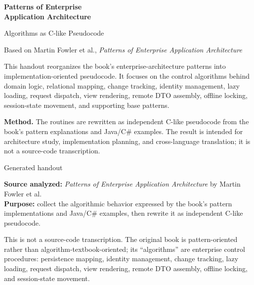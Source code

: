 \documentclass[11pt]{article}
\begin{document}
\hypersetup{pageanchor=false}

\begin{titlepage}
  \centering
  \vspace*{1.45cm}
  {\Huge\bfseries\color{POEAABlue}Patterns of Enterprise\\Application Architecture\par}
  \vspace{0.35cm}
  {\LARGE Algorithms as C-like Pseudocode\par}
  \vspace{0.25cm}
  {\large Based on Martin Fowler et al., \textit{Patterns of Enterprise Application Architecture}\par}
  \vspace{0.95cm}
  \begin{scopebox}
  This handout reorganizes the book's enterprise-architecture patterns into implementation-oriented pseudocode. It focuses on the control algorithms behind domain logic, relational mapping, change tracking, identity management, lazy loading, request dispatch, view rendering, remote DTO assembly, offline locking, session-state movement, and supporting base patterns.
  \end{scopebox}
  \vspace{0.75cm}
  \begin{methodbox}
  \textbf{Method.} The routines are rewritten as independent C-like pseudocode from the book's pattern explanations and Java/C\# examples. The result is intended for architecture study, implementation planning, and cross-language translation; it is not a source-code transcription.
  \end{methodbox}
  \vfill
  {\large Generated handout\par}
\end{titlepage}

\clearpage
\tableofcontents
\clearpage
\hypersetup{pageanchor=true}

\textbf{Source analyzed:} \emph{Patterns of Enterprise Application
Architecture} by Martin Fowler et al.\\
\textbf{Purpose:} collect the algorithmic behavior expressed by the
book's pattern implementations and Java/C\# examples, then rewrite it as
independent C-like pseudocode.

This is not a source-code transcription. The original book is
pattern-oriented rather than algorithm-textbook-oriented; its
``algorithms'' are enterprise control procedures: persistence mapping,
identity management, change tracking, lazy loading, request dispatch,
view rendering, remote DTO assembly, offline locking, and session-state
movement.
\end{document}

